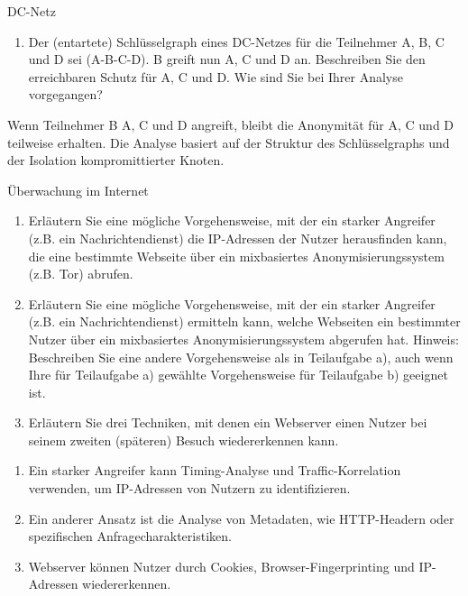 \documentclass{article}
\begin{document}
\begin{exercise}{DC-Netz}
  \begin{enumerate}
    \item Der (entartete) Schlüsselgraph eines DC-Netzes für die Teilnehmer A, B, C und D sei (A-B-C-D). B greift nun A, C und D an. Beschreiben Sie den erreichbaren Schutz für A, C und D. Wie sind Sie bei Ihrer Analyse vorgegangen?
  \end{enumerate}

  \begin{solution}
    Wenn Teilnehmer B A, C und D angreift, bleibt die Anonymität für A, C und D teilweise erhalten. Die Analyse basiert auf der Struktur des Schlüsselgraphs und der Isolation kompromittierter Knoten.
  \end{solution}
\end{exercise}

\setcounter{subsection}{238}
\begin{exercise}{Überwachung im Internet}
  \begin{enumerate}
    \item Erläutern Sie eine mögliche Vorgehensweise, mit der ein starker Angreifer (z.B. ein Nachrichtendienst) die IP-Adressen der Nutzer herausfinden kann, die eine bestimmte Webseite über ein mixbasiertes Anonymisierungssystem (z.B. Tor) abrufen.
    \item Erläutern Sie eine mögliche Vorgehensweise, mit der ein starker Angreifer (z.B. ein Nachrichtendienst) ermitteln kann, welche Webseiten ein bestimmter Nutzer über ein mixbasiertes Anonymisierungssystem abgerufen hat. Hinweis: Beschreiben Sie eine andere Vorgehensweise als in Teilaufgabe a), auch wenn Ihre für Teilaufgabe a) gewählte Vorgehensweise für Teilaufgabe b) geeignet ist.
    \item Erläutern Sie drei Techniken, mit denen ein Webserver einen Nutzer bei seinem zweiten (späteren) Besuch wiedererkennen kann.
  \end{enumerate}

  \begin{solution}
    \begin{enumerate}
      \item Ein starker Angreifer kann Timing-Analyse und Traffic-Korrelation verwenden, um IP-Adressen von Nutzern zu identifizieren.
      \item Ein anderer Ansatz ist die Analyse von Metadaten, wie HTTP-Headern oder spezifischen Anfragecharakteristiken.
      \item Webserver können Nutzer durch Cookies, Browser-Fingerprinting und IP-Adressen wiedererkennen.
    \end{enumerate}
  \end{solution}
\end{exercise}
\end{document}
